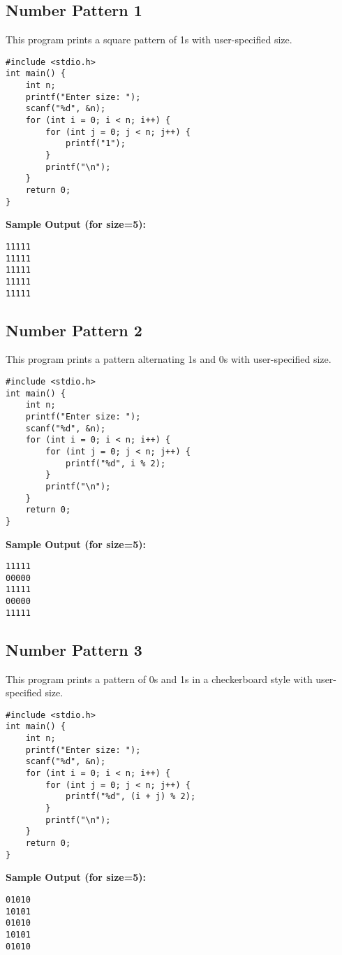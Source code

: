 \documentclass[a4paper,12pt]{article}
\begin{document}
\subsection{Number Pattern 1}
This program prints a square pattern of 1s with user-specified size.
\begin{lstlisting}[caption={Number Pattern 1}]
#include <stdio.h>
int main() {
    int n;
    printf("Enter size: ");
    scanf("%d", &n);
    for (int i = 0; i < n; i++) {
        for (int j = 0; j < n; j++) {
            printf("1");
        }
        printf("\n");
    }
    return 0;
}
\end{lstlisting}
\textbf{Sample Output (for size=5):}
\begin{verbatim}
11111
11111
11111
11111
11111
\end{verbatim}
\clearpage

\subsection{Number Pattern 2}
This program prints a pattern alternating 1s and 0s with user-specified size.
\begin{lstlisting}[caption={Number Pattern 2}]
#include <stdio.h>
int main() {
    int n;
    printf("Enter size: ");
    scanf("%d", &n);
    for (int i = 0; i < n; i++) {
        for (int j = 0; j < n; j++) {
            printf("%d", i % 2);
        }
        printf("\n");
    }
    return 0;
}
\end{lstlisting}
\textbf{Sample Output (for size=5):}
\begin{verbatim}
11111
00000
11111
00000
11111
\end{verbatim}
\clearpage

\subsection{Number Pattern 3}
This program prints a pattern of 0s and 1s in a checkerboard style with user-specified size.
\begin{lstlisting}[caption={Number Pattern 3}]
#include <stdio.h>
int main() {
    int n;
    printf("Enter size: ");
    scanf("%d", &n);
    for (int i = 0; i < n; i++) {
        for (int j = 0; j < n; j++) {
            printf("%d", (i + j) % 2);
        }
        printf("\n");
    }
    return 0;
}
\end{lstlisting}
\textbf{Sample Output (for size=5):}
\begin{verbatim}
01010
10101
01010
10101
01010
\end{verbatim}
\clearpage
\end{document}
